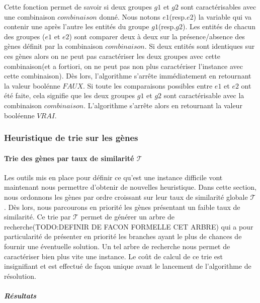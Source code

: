 Cette fonction permet de savoir si deux groupes $g1$ et $g2$ sont caractérisables avec une combinaison $combinaison$ donné. Nous notons $e1$(resp.$e2$) la variable qui va contenir une après l'autre les entités du groupe $g1$(resp.$g2$). Les entités de chacun des groupes ($e1$ et $e2$) sont comparer deux à deux sur la présence/absence des gènes définit par la combinaison $combinaison$. Si deux entités sont identiques sur ces gènes alors on ne peut pas caractériser les deux groupes avec cette combinaison(et a fortiori, on ne peut pas non plus caractériser l'instance avec cette combinaison). Dès lors, l'algorithme s'arrête immédiatement en retournant la valeur boolénne $FAUX$. Si toute les comparaisons possibles entre $e1$ et $e2$ ont été faite, cela signifie que les deux groupes $g1$ et $g2$ sont caractérisable avec la combinaison $combinaison$. L'algorithme s'arrête alors en retournant la valeur booléenne $VRAI$.



\subsubsection{Heuristique de trie sur les gènes }
\paragraph{Trie des gènes par taux de similarité $\mathcal{T}$}
Les outils mis en place pour définir ce qu'est une instance difficile vont maintenant nous permettre d'obtenir de nouvelles heuristique. Dans cette section, nous ordonnons les gènes par ordre croissant sur leur taux de similarité globale $\mathcal{T}$. Dès lors, nous parcourons en priorité les gènes présentant un faible taux de similarité. Ce trie par $\mathcal{T}$ permet de générer un arbre de recherche(TODO:DEFINIR DE FACON FORMELLE CET ARBRE) qui a pour particularité de présenter en priorité les branches ayant le plus de chances de fournir une éventuelle solution. Un tel arbre de recherche nous permet de caractériser bien plus vite une instance. Le coût de calcul de ce trie est insignifiant et est effectué de façon unique avant le lancement de l'algorithme de résolution.

\subparagraph{Résultats}

